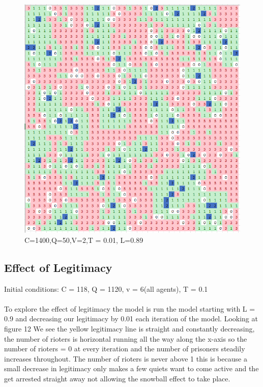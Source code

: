 \documentclass[11pt]{article}
\begin{document}
	\begin{figure}[H]
		\includegraphics[width=\linewidth]{snowball_2.png}
		\caption{C=1400,Q=50,V=2,T = 0.01, L=0.89}
		\label{fig:}
	\end{figure}

	\subsection{Effect of Legitimacy}
	Initial conditions: C = 118, Q = 1120, v = 6(all agents), T = 0.1\\
	\\
	
	To explore the effect of legitimacy the model is run the model starting with L = 0.9 and decreasing our legitimacy by 0.01 each iteration of the model. Looking at figure 12 We see the yellow legitimacy line is straight and constantly decreasing, the number of rioters is horizontal running all the way along the x-axis so the number of rioters = 0 at every iteration and the number of prisoners steadily increases throughout. The number of rioters is never above 1 this is because a small decrease in legitimacy only makes a few quiets want to come active and the get arrested straight away not allowing the snowball effect to take place.
	
\end{document}
